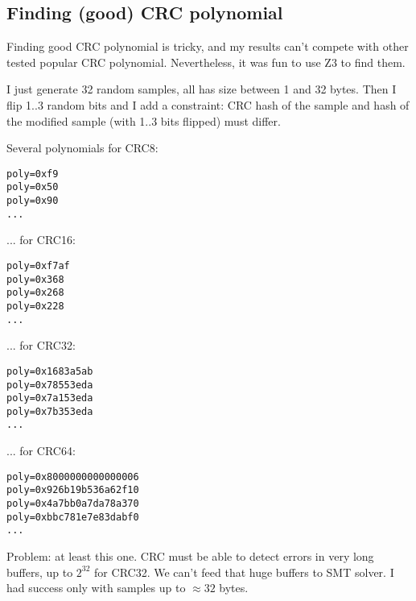 \subsection{Finding (good) CRC polynomial}

Finding good CRC polynomial is tricky, and my results can't compete with other tested popular CRC polynomial.
Nevertheless, it was fun to use Z3 to find them.

I just generate 32 random samples, all has size between 1 and 32 bytes.
Then I flip 1..3 random bits and I add a constraint: CRC hash of the sample and hash of the modified sample (with 1..3 bits flipped) must differ.



Several polynomials for CRC8:

\begin{lstlisting}
poly=0xf9
poly=0x50
poly=0x90
...
\end{lstlisting}

... for CRC16:

\begin{lstlisting}
poly=0xf7af
poly=0x368
poly=0x268
poly=0x228
...
\end{lstlisting}

... for CRC32:

\begin{lstlisting}
poly=0x1683a5ab
poly=0x78553eda
poly=0x7a153eda
poly=0x7b353eda
...
\end{lstlisting}

... for CRC64:

\begin{lstlisting}
poly=0x8000000000000006
poly=0x926b19b536a62f10
poly=0x4a7bb0a7da78a370
poly=0xbbc781e7e83dabf0
...
\end{lstlisting}

Problem: at least this one. CRC must be able to detect errors in very long buffers, up to $2^{32}$ for CRC32. We can't feed that huge buffers to SMT solver.
I had success only with samples up to $\approx 32$ bytes.

